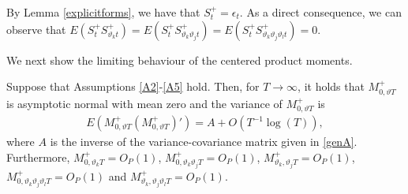 {{By Lemma \ref{explicitforms}, we have that $S_t^+ = \epsilon_t$. As a direct consequence, we can observe that $E\left( S^+_{t} S^+_{\vartheta_k t} \right) =E\left( S^+_{t} S^+_{\vartheta_k \vartheta_j t} \right) = E\left( S^+_{t} S^+_{\vartheta_k \vartheta_j \vartheta_l  t} \right) = 0$.


We next show the limiting behaviour of the centered product moments.
\begin{lemma} \label{genlemmma1}
Suppose that Assumptions \ref{A2}-\ref{A5} hold. Then, for $T\rightarrow \infty$, it holds that $M^+_{0,\vartheta T}$ is asymptotic normal with mean zero and the variance of $M^+_{0,\vartheta T}$ is 
\begin{align*}  
     E\left(M^+_{0,\vartheta T} (M^+_{0,\vartheta T})' \right) = A + O(T^{-1} \log(T)), 
\end{align*}
where $A$ is the inverse of the variance-covariance matrix given in \eqref{genA}.
Furthermore, $M^+_{0,\vartheta_k  T} = O_P(1)$, $M^+_{0,\vartheta_k \vartheta_j   T} = O_P(1)$, $ M^+_{\vartheta_k,\vartheta_j   T} = O_P(1)$, $ M^+_{0,\vartheta_k \vartheta_j \vartheta_l  T} = O_P(1)$ and $M^+_{\vartheta_k,\vartheta_j \vartheta_l  T} = O_P(1)$. 







\end{lemma}}}
